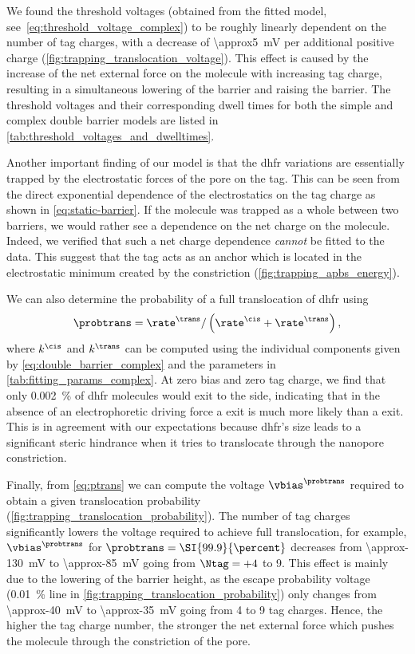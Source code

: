 We found the threshold voltages (obtained from the fitted model, see~\cref{eq:threshold_voltage_complex}) to
be roughly linearly dependent on the number of tag charges, with a decrease of \SI{\approx5}{\mV} per
additional positive charge (\cref{fig:trapping_translocation_voltage}). This effect is caused by the increase
of the net external force on the molecule with increasing tag charge, resulting in a simultaneous lowering of
the \transi{} barrier and raising the \cisi{} barrier. The threshold voltages and their corresponding
dwell times for both the simple and complex double barrier models are listed in
\cref{tab:threshold_voltages_and_dwelltimes}.

Another important finding of our model is that the \gls{dhfr} variations are essentially trapped by the
electrostatic forces of the pore on the tag. This can be seen from the direct exponential dependence of the
electrostatics on the tag charge as shown in \cref{eq:static-barrier}. If the molecule was trapped as a whole
between two barriers, we would rather see a dependence on the net charge on the molecule. Indeed, we verified
that such a net charge dependence \emph{cannot} be fitted to the data. This suggest that the tag acts as an
anchor which is located in the electrostatic minimum created by the \transi{} constriction
(\cref{fig:trapping_apbs_energy}).

We can also determine the probability of a full translocation of \gls{dhfr} using
%
\begin{align}\label{eq:ptrans}
  \probtrans = \rate^{\trans} / \left( \rate^{\cis} + \rate^{\trans} \right),
\end{align}
%
where $k^\cis$ and $k^\trans$ can be computed using the individual components given by
\cref{eq:double_barrier_complex} and the parameters in \cref{tab:fitting_params_complex}. At zero bias and
zero tag charge, we find that only \SI{0.002}{\percent} of \gls{dhfr} molecules would exit to the \transi{}
side, indicating that in the absence of an electrophoretic driving force a \cisi{} exit is much more likely
than a \transi{} exit. This is in agreement with our expectations because \gls{dhfr}'s size leads to a
significant steric hindrance when it tries to translocate through the nanopore constriction.

Finally, from \cref{eq:ptrans} we can compute the voltage $\vbias^{\probtrans}$ required to obtain a given
translocation probability (\cref{fig:trapping_translocation_probability}). The number of tag charges
significantly lowers the voltage required to achieve full translocation, for example, $\vbias^{\probtrans}$
for $\probtrans = \SI{99.9}{\percent}$ decreases from \SI{\approx-130}{\mV} to \SI{\approx-85}{\mV} going from
$\Ntag = +4$ to \num{+9}. This effect is mainly due to the lowering of the \transi{} barrier height, as the
\cisi{} escape probability voltage (\SI{0.01}{\percent} line in \cref{fig:trapping_translocation_probability})
only changes from \SI{\approx-40}{\mV} to \SI{\approx-35}{\mV} going from \num{+4} to \num{+9} tag charges.
Hence, the higher the tag charge number, the stronger the net external force which pushes the molecule through
the \transi{} constriction of the pore.

